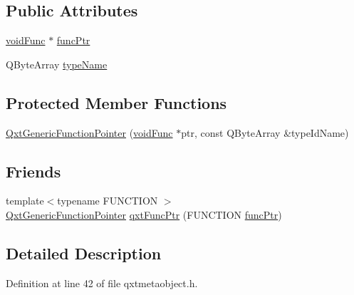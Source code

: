 \subsection*{Public Attributes}
\begin{DoxyCompactItemize}
\item 
\hyperlink{class_qxt_generic_function_pointer_a280e21b8a04a2f7c8f5cf7aeeeb2fd33}{void\-Func} $\ast$ \hyperlink{class_qxt_generic_function_pointer_abe4abbb31df76fe0b28047461216dca8}{func\-Ptr}
\item 
Q\-Byte\-Array \hyperlink{class_qxt_generic_function_pointer_a0ec2f6f26bec4a9ccfac2b34ff750b0a}{type\-Name}
\end{DoxyCompactItemize}
\subsection*{Protected Member Functions}
\begin{DoxyCompactItemize}
\item 
\hyperlink{class_qxt_generic_function_pointer_a5aeafdd4e4f877c6b2fcb06a014fd770}{Qxt\-Generic\-Function\-Pointer} (\hyperlink{class_qxt_generic_function_pointer_a280e21b8a04a2f7c8f5cf7aeeeb2fd33}{void\-Func} $\ast$ptr, const Q\-Byte\-Array \&type\-Id\-Name)
\end{DoxyCompactItemize}
\subsection*{Friends}
\begin{DoxyCompactItemize}
\item 
{\footnotesize template$<$typename F\-U\-N\-C\-T\-I\-O\-N $>$ }\\\hyperlink{class_qxt_generic_function_pointer}{Qxt\-Generic\-Function\-Pointer} \hyperlink{class_qxt_generic_function_pointer_ade9b17dfe1949307a14bf0a549e373d8}{qxt\-Func\-Ptr} (F\-U\-N\-C\-T\-I\-O\-N \hyperlink{class_qxt_generic_function_pointer_abe4abbb31df76fe0b28047461216dca8}{func\-Ptr})
\end{DoxyCompactItemize}


\subsection{Detailed Description}


Definition at line 42 of file qxtmetaobject.\-h.



